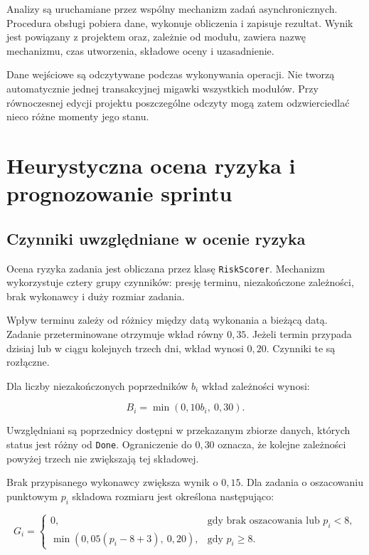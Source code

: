 Analizy są uruchamiane przez wspólny mechanizm zadań asynchronicznych. Procedura obsługi pobiera dane, wykonuje obliczenia i zapisuje rezultat. Wynik jest powiązany z projektem oraz, zależnie od modułu, zawiera nazwę mechanizmu, czas utworzenia, składowe oceny i uzasadnienie.

Dane wejściowe są odczytywane podczas wykonywania operacji. Nie tworzą automatycznie jednej transakcyjnej migawki wszystkich modułów. Przy równoczesnej edycji projektu poszczególne odczyty mogą zatem odzwierciedlać nieco różne momenty jego stanu.

\section{Heurystyczna ocena ryzyka i prognozowanie sprintu}

\subsection{Czynniki uwzględniane w ocenie ryzyka}

Ocena ryzyka zadania jest obliczana przez klasę \texttt{RiskScorer}. Mechanizm wykorzystuje cztery grupy czynników: presję terminu, niezakończone zależności, brak wykonawcy i duży rozmiar zadania.

Wpływ terminu zależy od różnicy między datą wykonania a bieżącą datą. Zadanie przeterminowane otrzymuje wkład równy \(0{,}35\). Jeżeli termin przypada dzisiaj lub w ciągu kolejnych trzech dni, wkład wynosi \(0{,}20\). Czynniki te są rozłączne.

Dla liczby niezakończonych poprzedników \(b_i\) wkład zależności wynosi:

\begin{equation}
    B_i = \min(0{,}10b_i,\ 0{,}30).
    \label{eq:ryzyko-zaleznosci}
\end{equation}

Uwzględniani są poprzednicy dostępni w przekazanym zbiorze danych, których status jest różny od \texttt{Done}. Ograniczenie do \(0{,}30\) oznacza, że kolejne zależności powyżej trzech nie zwiększają tej składowej.

Brak przypisanego wykonawcy zwiększa wynik o \(0{,}15\). Dla zadania o oszacowaniu punktowym \(p_i\) składowa rozmiaru jest określona następująco:

\begin{equation}
    G_i =
    \begin{cases}
        0, & \text{gdy brak oszacowania lub } p_i < 8,\\
        \min\left(0{,}05(p_i-8+3),\ 0{,}20\right),
        & \text{gdy } p_i \geq 8.
    \end{cases}
    \label{eq:ryzyko-rozmiar}
\end{equation}

